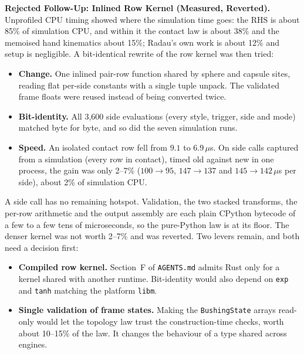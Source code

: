 \documentclass[11pt,a4paper]{article}
\begin{document}
\textbf{Rejected Follow-Up: Inlined Row Kernel (Measured, Reverted).} Unprofiled CPU timing showed where the
simulation time goes: the RHS is about 85\% of simulation CPU, and within it the contact law is about 38\% and
the memoised hand kinematics about 15\%; Radau's own work is about 12\% and setup is negligible. A bit-identical rewrite
of the row kernel was then tried:
\begin{itemize}[leftmargin=*,noitemsep]
\item \textbf{Change.} One inlined pair-row function shared by sphere and capsule sites, reading flat per-side
  constants with a single tuple unpack. The validated frame floats were reused instead of being converted twice.
\item \textbf{Bit-identity.} All 3{,}600 side evaluations (every style, trigger, side and mode) matched byte for byte,
  and so did the seven simulation runs.
\item \textbf{Speed.} An isolated contact row fell from $9.1$ to $6.9\,\mu$s. On side calls captured from a simulation
  (every row in contact), timed old against new in one process, the gain was only 2--7\% ($100 \to 95$, $147 \to 137$
  and $145 \to 142\,\mu$s per side), about 2\% of simulation CPU.
\end{itemize}
A side call has no remaining hotspot. Validation, the two stacked transforms, the per-row arithmetic and the output
assembly are each plain CPython bytecode of a few to a few tens of microseconds, so the pure-Python law is at its
floor. The denser kernel was not worth 2--7\% and was reverted. Two levers remain, and both need a decision first:
\begin{itemize}[leftmargin=*,noitemsep]
\item \textbf{Compiled row kernel.} Section~F of \texttt{AGENTS.md} admits Rust only for a kernel shared with another
  runtime. Bit-identity would also depend on \texttt{exp} and \texttt{tanh} matching the platform \texttt{libm}.
\item \textbf{Single validation of frame states.} Making the \texttt{BushingState} arrays read-only would let the
  topology law trust the construction-time checks, worth about 10--15\% of the law. It changes the behaviour of a type
  shared across engines.
\end{itemize}
\end{document}
